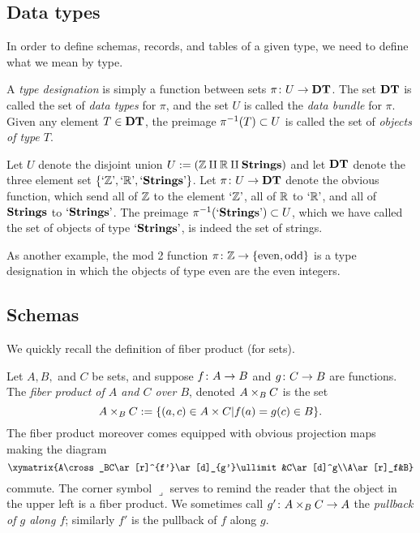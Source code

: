 \documentclass{amsart}
\def\DT{{\bf DT}}
\def\Strings{{\bf Strings}}
\def\'{\tn{'}}
\begin{document}
\subsection{Data types}

In order to define schemas, records, and tables of a given type, we need to define what we mean by type. 

\begin{definition}

A {\em type designation} is simply a function between sets $\pi\taking U\to \DT$.  The set $\DT$ is called the set of {\em data types} for $\pi$, and the set $U$ is called the {\em data bundle} for $\pi$.  Given any element $T\in\DT$, the preimage $\pi^\m1(T)\ss U$ is called the set of {\em objects of type $T$}.

\end{definition}

\begin{example}\label{ex:type designation}

Let $U$ denote the disjoint union $U:=(\ZZ\amalg\RR\amalg\Strings)$ and let $\DT$ denote the three element set $\{`\ZZ\', `\RR\', `\Strings\'\}$.  Let $\pi\taking U\to\DT$ denote the obvious function, which send all of ${\mathbb Z}$ to the element $`\ZZ\'$, all of ${\mathbb R}$ to $`\RR\'$, and all of $\Strings$ to $`\Strings\'$. 
The preimage $\pi^\m1(`\Strings\')\ss U$, which we have called the set of objects of type $`\Strings\'$, is indeed the set of strings.

As another example, the mod 2 function $\pi\colon{\mathbb Z}\rightarrow\{\textnormal{even},\textnormal{odd}\}$ is a type designation in which the objects of type even are the even integers.

\end{example}

\subsection{Schemas}

We quickly recall the definition of fiber product (for sets).

\begin{definition}

Let $A, B,$ and $C$ be sets, and suppose $f\colon A\rightarrow B$ and $g\colon C\rightarrow B$ are functions.  The {\em fiber product of $A$ and $C$ over $B$}, denoted $A\times_BC$ is the set $$A\times_BC:=\{(a,c)\in A\times C | f(a)=g(c)\in B\}.$$  The fiber product moreover comes equipped with obvious projection maps making the diagram $$\xymatrix{A\cross_BC\ar[r]^{f'}\ar[d]_{g'}\ullimit&C\ar[d]^g\\A\ar[r]_f&B}$$ commute.  The corner symbol $\lrcorner$ serves to remind the reader that the object in the upper left is a fiber product.   We sometimes call $g'\colon A\times_BC\rightarrow A$ the {\em pullback of $g$ along $f$}; similarly $f'$ is the pullback of $f$ along $g$.

\end{definition}
\end{document}
